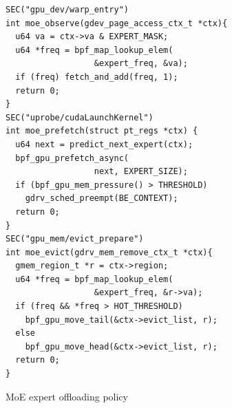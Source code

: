 \begin{figure}[t]
\begin{lstlisting}[xleftmargin=0pt,numbers=none]
SEC("gpu_dev/warp_entry")
int moe_observe(gdev_page_access_ctx_t *ctx){
  u64 va = ctx->va & EXPERT_MASK;
  u64 *freq = bpf_map_lookup_elem(
                  &expert_freq, &va);
  if (freq) fetch_and_add(freq, 1);
  return 0;
}
SEC("uprobe/cudaLaunchKernel")
int moe_prefetch(struct pt_regs *ctx) {
  u64 next = predict_next_expert(ctx);
  bpf_gpu_prefetch_async(
                  next, EXPERT_SIZE);
  if (bpf_gpu_mem_pressure() > THRESHOLD)
    gdrv_sched_preempt(BE_CONTEXT);
  return 0;
}
SEC("gpu_mem/evict_prepare")
int moe_evict(gdrv_mem_remove_ctx_t *ctx){
  gmem_region_t *r = ctx->region;
  u64 *freq = bpf_map_lookup_elem(
                  &expert_freq, &r->va);
  if (freq && *freq > HOT_THRESHOLD)
    bpf_gpu_move_tail(&ctx->evict_list, r);
  else
    bpf_gpu_move_head(&ctx->evict_list, r);
  return 0;
}
\end{lstlisting}
\caption{MoE expert offloading policy}
\label{fig:moe-listing}
\end{figure}
